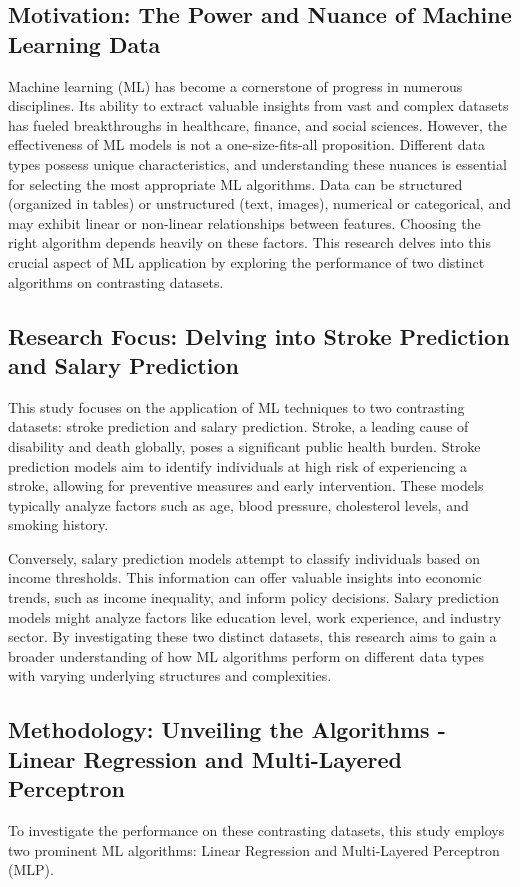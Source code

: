 \documentclass[runningheads]{paper}
\begin{document}
\subsection{Motivation: The Power and Nuance of Machine Learning Data}
Machine learning (ML) has become a cornerstone of progress in numerous 
disciplines. Its ability to extract valuable insights from vast and complex 
datasets has fueled breakthroughs in healthcare, finance, and social sciences. 
However, the effectiveness of ML models is not a one-size-fits-all proposition. 
Different data types possess unique characteristics, and understanding these 
nuances is essential for selecting the most appropriate ML algorithms. Data can 
be structured (organized in tables) or unstructured (text, images), numerical 
or categorical, and may exhibit linear or non-linear relationships between 
features.  Choosing the right algorithm depends heavily on these factors. This 
research delves into this crucial aspect of ML application by exploring the 
performance of two distinct algorithms on contrasting datasets.

\subsection{Research Focus: Delving into Stroke Prediction and Salary Prediction}
This study focuses on the application of ML techniques to two contrasting 
datasets: stroke prediction and salary prediction. Stroke, a leading cause of 
disability and death globally, poses a significant public health burden. Stroke 
prediction models aim to identify individuals at high risk of experiencing a 
stroke, allowing for preventive measures and early intervention. These models 
typically analyze factors such as age, blood pressure, cholesterol levels, and 
smoking history.

Conversely, salary prediction models attempt to classify individuals based on 
income thresholds. This information can offer valuable insights into economic 
trends, such as income inequality, and inform policy decisions. Salary 
prediction models might analyze factors like education level, work experience, 
and industry sector. By investigating these two distinct datasets, this research 
aims to gain a broader understanding of how ML algorithms perform on different 
data types with varying underlying structures and complexities.

\subsection{Methodology: Unveiling the Algorithms - Linear Regression and Multi-Layered Perceptron}
To investigate the performance on these contrasting datasets, this study employs 
two prominent ML algorithms: Linear Regression and Multi-Layered Perceptron (MLP). 
\end{document}
